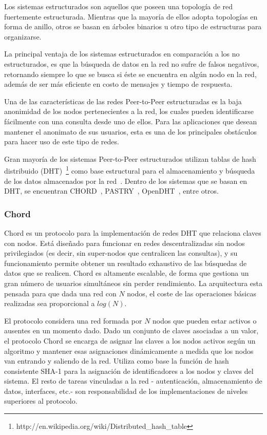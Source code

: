 Los sistemas estructurados son aquellos que poseen una topología de red
fuertemente estructurada. Mientras que la mayoría de ellos adopta topologías en
forma de anillo, otros se basan en árboles binarios u otro tipo de estructuras
para organizarse.

La principal ventaja de los sistemas estructurados en comparación a los no
estructurados, es que la búsqueda de datos en la red no sufre de falsos
negativos, retornando siempre lo
que se busca si éste se encuentra en algún nodo en la red, además de ser más eficiente en
costo de mensajes y tiempo de respuesta.

Una de las características de las redes Peer-to-Peer estructuradas es la baja
anonimidad de los nodos pertenecientes a la red, los cuales pueden
identificarse fácilmente con una consulta desde uno de ellos. Para las
aplicaciones que desean mantener el anonimato de sus usuarios, esta es una de
los principales obstáculos para hacer uso de este tipo de redes.

Gran mayoría de los sistemas Peer-to-Peer estructurados utilizan tablas de hash
distribuido (DHT)~\footnote{http://en.wikipedia.org/wiki/Distributed\_hash\_table}
como base estructural para el almacenamiento y búsqueda de los datos
almacenados por la red~\cite{BalakrishnanEtAl03}. Dentro de los sistemas que se basan en DHT, se
encuentran 
CHORD~\cite{conf:hotos:DabekBKKMSB01},
PASTRY~\cite{oai:CiteSeerPSU:441779},
OpenDHT~\cite{Rhea:2005:OPD:1080091.1080102},
entre otros.

\subsubsection{Chord}
\label{sec:chord}

Chord es un protocolo para la implementación de redes DHT que relaciona claves con nodos. Está diseñado para
funcionar en redes descentralizadas sin nodos privilegiados (es decir, sin super-nodos
que centralicen las consultas), y su funcionamiento permite obtener un resultado exhaustivo de
las búsquedas de datos que se realicen. Chord es altamente escalable, de forma que
gestiona un gran número de usuarios simultáneos sin perder rendimiento. La arquitectura
esta pensada para que dada una red con $N$ nodos, el coste de las operaciones básicas
realizadas sea proporcional a $log(N)$.

El protocolo considera una red formada por $N$ nodos que pueden estar activos o
ausentes en un momento dado. Dado un conjunto de claves
asociadas a un valor, el protocolo Chord se encarga de asignar las claves a los
nodos activos según un algoritmo y mantener esas asignaciones dinámicamente a medida
que los nodos van entrando y saliendo de la red. Utiliza como base la función
de hash consistente SHA-1 para la asignación de identificadores a los nodos y
claves del sistema.
El resto de tareas vinculadas a la red - autenticación, almacenamiento de
datos, interfaces, etc.- son responsabilidad de los implementaciones de niveles
superiores al protocolo.

